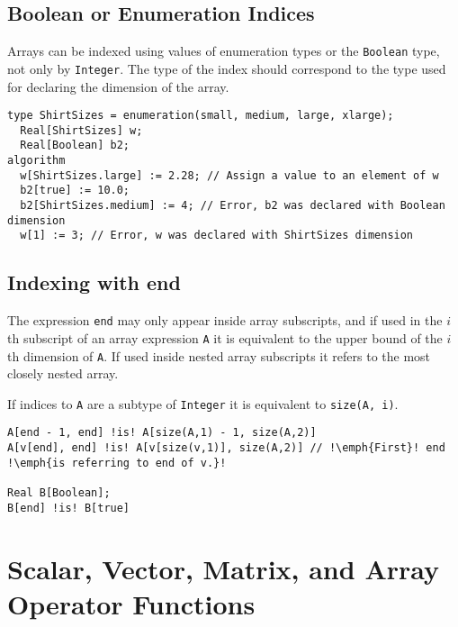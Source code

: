 \subsection{Boolean or Enumeration Indices}\label{boolean-or-enumeration-indices}

Arrays can be indexed using values of enumeration types or the \lstinline!Boolean! type, not only by \lstinline!Integer!.  The type of the index should correspond to
the type used for declaring the dimension of the array.

\begin{example}
\begin{lstlisting}[language=modelica]
  type ShirtSizes = enumeration(small, medium, large, xlarge);
  Real[ShirtSizes] w;
  Real[Boolean] b2;
algorithm
  w[ShirtSizes.large] := 2.28; // Assign a value to an element of w
  b2[true] := 10.0;
  b2[ShirtSizes.medium] := 4; // Error, b2 was declared with Boolean dimension
  w[1] := 3; // Error, w was declared with ShirtSizes dimension
\end{lstlisting}
\end{example}

\subsection{Indexing with end}\label{indexing-with-end}

The expression \lstinline!end! may only appear inside array subscripts, and if used in the $i$th subscript of an array expression \lstinline!A! it is equivalent to the upper bound of the $i$th dimension of \lstinline!A!.
If used inside nested array subscripts it refers to the most closely nested array.

\begin{nonnormative}
If indices to \lstinline!A! are a subtype of \lstinline!Integer! it is equivalent to \lstinline!size(A, i)!.
\end{nonnormative}

\begin{example}
\begin{lstlisting}[language=modelica, escapechar=!]
A[end - 1, end] !is! A[size(A,1) - 1, size(A,2)]
A[v[end], end] !is! A[v[size(v,1)], size(A,2)] // !\emph{First}! end !\emph{is referring to end of v.}!

Real B[Boolean];
B[end] !is! B[true]
\end{lstlisting}
\end{example}

\section{Scalar, Vector, Matrix, and Array Operator Functions}\label{scalar-vector-matrix-and-array-operator-functions}

